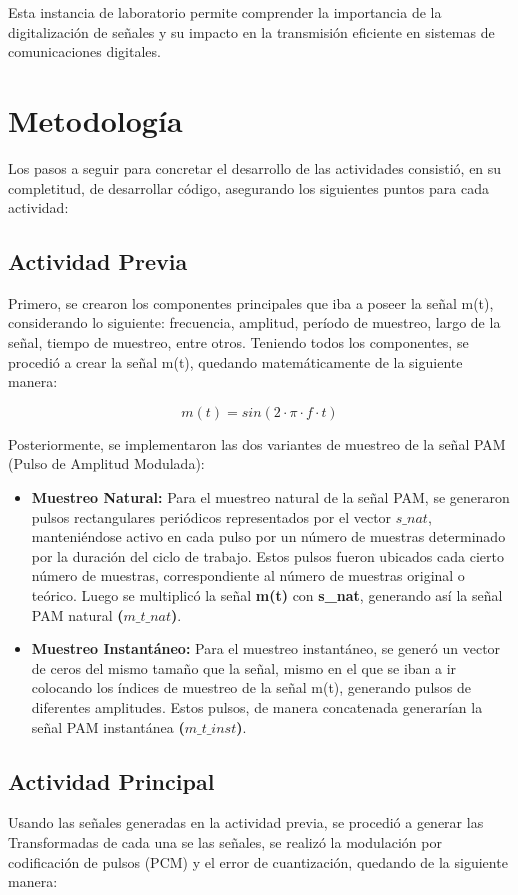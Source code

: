 \documentclass[12pt]{article}
\begin{document}
Esta instancia de laboratorio permite comprender la importancia de la digitalización de señales y su impacto en la transmisión eficiente en sistemas de comunicaciones digitales.

\section{Metodología}
Los pasos a seguir para concretar el desarrollo de las actividades consistió, en su completitud, de desarrollar código, asegurando los siguientes puntos para cada actividad:

\subsection{Actividad Previa}
Primero, se crearon los componentes principales que iba a poseer la señal m(t), considerando lo siguiente: frecuencia, amplitud, período de muestreo, largo de la señal, tiempo de muestreo, entre otros. Teniendo todos los componentes, 
se procedió a crear la señal m(t), quedando matemáticamente de la siguiente manera:

$$m(t)=sin(2 \cdot \pi \cdot f \cdot t)$$

Posteriormente, se implementaron las dos variantes de muestreo de la señal PAM (Pulso de Amplitud Modulada):

\begin{itemize}
    \item \textbf{Muestreo Natural:} Para el muestreo natural de la señal PAM, se generaron pulsos rectangulares periódicos representados por el vector $s\_nat$, manteniéndose activo en cada pulso por un número de muestras determinado por la duración del ciclo de trabajo. Estos pulsos fueron ubicados cada cierto número de muestras, correspondiente al número de muestras original o teórico. Luego se multiplicó la señal \textbf{m(t)} con \textbf{s\_nat}, generando así la señal PAM natural \textbf{($m\_t\_nat$)}. 
    
    \item \textbf{Muestreo Instantáneo:} Para el muestreo instantáneo, se generó un vector de ceros del mismo tamaño que la señal, mismo en el que se iban a ir colocando los índices de muestreo de la señal m(t), generando pulsos de diferentes amplitudes. Estos pulsos, de manera concatenada generarían la señal PAM instantánea \textbf{($m\_t\_inst$)}.
\end{itemize}

\subsection{Actividad Principal}
Usando las señales generadas en la actividad previa, se procedió a generar las Transformadas de cada una se las señales, se realizó la modulación por codificación de pulsos (PCM) y el error de cuantización, quedando de la siguiente manera:
\end{document}
